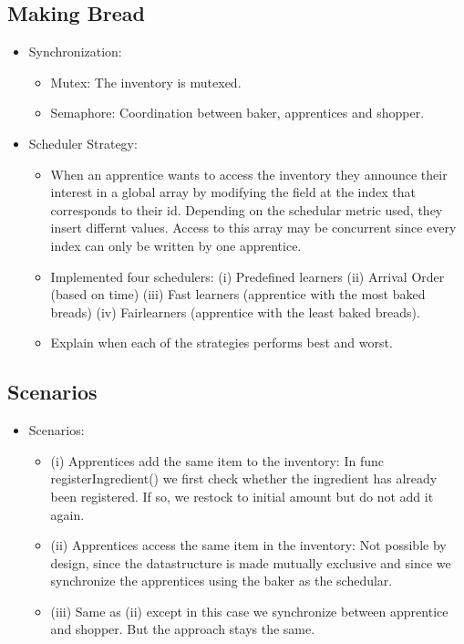 \documentclass[11pt]{article}
\begin{document}
\subsection{Making Bread}
\label{sec:orgac53115}

\begin{itemize}
\item Synchronization:\\
\begin{itemize}
\item Mutex: The inventory is mutexed.\\
\item Semaphore: Coordination between baker, apprentices and shopper.\\
\end{itemize}
\item Scheduler Strategy:\\
\begin{itemize}
\item When an apprentice wants to access the inventory they announce their interest in a global array by modifying the field at the index that corresponds to their id. Depending on the schedular metric used, they insert differnt values. Access to this array may be concurrent since every index can only be written by one apprentice.\\
\item Implemented four schedulers: (i) Predefined learners (ii) Arrival Order (based on time) (iii) Fast learners (apprentice with the most baked breads) (iv) Fairlearners (apprentice with the least baked breads).\\
\item Explain when each of the strategies performs best and worst.\\
\end{itemize}
\end{itemize}

\subsection{Scenarios}
\label{sec:orgb90574b}
\begin{itemize}
\item Scenarios:\\
\begin{itemize}
\item (i) Apprentices add the same item to the inventory: In func registerIngredient() we first check whether the ingredient has already been registered. If so, we restock to initial amount but do not add it again.\\
\item (ii) Apprentices access the same item in the inventory: Not possible by design, since the datastructure is made mutually exclusive and since we synchronize the apprentices using the baker as the schedular.\\
\item (iii) Same as (ii) except in this case we synchronize between apprentice and shopper. But the approach stays the same.\\
\end{itemize}
\end{itemize}
\end{document}

